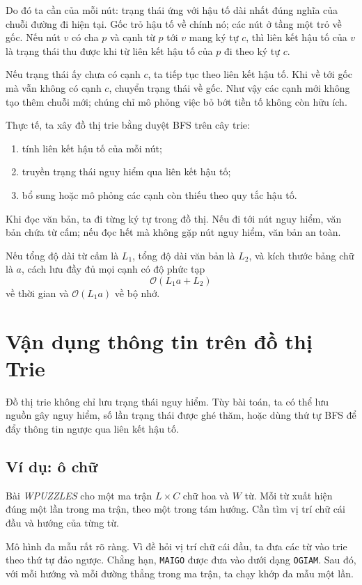 \documentclass[11pt]{article}
\newcommand{\Oh}{\mathcal{O}}
\begin{document}
Do đó ta cần  của mỗi nút: trạng thái ứng với hậu tố dài
nhất đúng nghĩa của chuỗi đường đi hiện tại. Gốc trỏ hậu tố về chính nó; các
nút ở tầng một trỏ về gốc. Nếu nút \(v\) có cha \(p\) và cạnh từ \(p\) tới
\(v\) mang ký tự \(c\), thì liên kết hậu tố của \(v\) là trạng thái thu được
khi từ liên kết hậu tố của \(p\) đi theo ký tự \(c\).

Nếu trạng thái ấy chưa có cạnh \(c\), ta tiếp tục theo liên kết hậu tố. Khi về
tới gốc mà vẫn không có cạnh \(c\), chuyển trạng thái về gốc. Như vậy các cạnh
mới không tạo thêm chuỗi mới; chúng chỉ mô phỏng việc bỏ bớt tiền tố không còn
hữu ích.

Thực tế, ta xây đồ thị trie bằng duyệt BFS trên cây trie:
\begin{enumerate}
  \item tính liên kết hậu tố của mỗi nút;
  \item truyền trạng thái nguy hiểm qua liên kết hậu tố;
  \item bổ sung hoặc mô phỏng các cạnh còn thiếu theo quy tắc hậu tố.
\end{enumerate}
Khi đọc văn bản, ta đi từng ký tự trong đồ thị. Nếu đi tới nút nguy hiểm, văn
bản chứa từ cấm; nếu đọc hết mà không gặp nút nguy hiểm, văn bản an toàn.

Nếu tổng độ dài từ cấm là \(L_1\), tổng độ dài văn bản là \(L_2\), và kích
thước bảng chữ là \(a\), cách lưu đầy đủ mọi cạnh có độ phức tạp
\[
  \Oh(L_1a+L_2)
\]
về thời gian và \(\Oh(L_1a)\) về bộ nhớ.

\section{Vận dụng thông tin trên đồ thị Trie}

Đồ thị trie không chỉ lưu trạng thái nguy hiểm. Tùy bài toán, ta có thể lưu
nguồn gây nguy hiểm, số lần trạng thái được ghé thăm, hoặc dùng thứ tự BFS để
đẩy thông tin ngược qua liên kết hậu tố.

\subsection{Ví dụ: ô chữ}

Bài \textit{WPUZZLES} cho một ma trận \(L\times C\) chữ hoa và \(W\) từ. Mỗi
từ xuất hiện đúng một lần trong ma trận, theo một trong tám hướng. Cần tìm vị
trí chữ cái đầu và hướng của từng từ.

Mô hình đa mẫu rất rõ ràng. Vì đề hỏi vị trí chữ cái đầu, ta đưa các từ vào
trie theo thứ tự đảo ngược. Chẳng hạn, \texttt{MAIGO} được đưa vào dưới dạng
\texttt{OGIAM}. Sau đó, với mỗi hướng và mỗi đường thẳng trong ma trận, ta chạy
khớp đa mẫu một lần.
\end{document}
